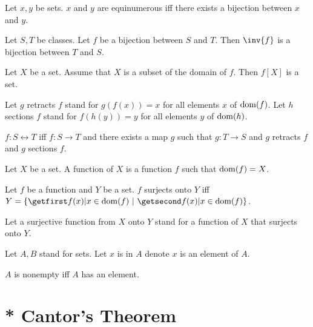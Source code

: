 \documentclass{article}
\begin{document}
\begin{forthel}
    \begin{definition*}
      Let $x, y$ be sets.
      $x$ and $y$ are equinumerous iff there exists a bijection between $x$ and
      $y$.
    \end{definition*}


\begin{lemma} Let $S, T$ be classes.
Let $f$ be a bijection between $S$ and $T$.
Then $\inv{f}$ is a bijection between $T$ and $S$.
\end{lemma}

  \begin{axiom}
    Let $X$ be a set.
    Assume that $X$ is a subset of the domain of $f$.
    Then $f[X]$ is a set.
  \end{axiom}

  Let $g$ retracts $f$ stand for $g(f(x)) = x$ for all elements $x$ of
  $\operatorname{dom}(f)$.
  Let $h$ sections $f$ stand for $f(h(y)) = y$ for all elements $y$ of
  $\operatorname{dom}(h)$.

  \begin{definition}
    $f : S \leftrightarrow T$ iff $f : S \rightarrow T$ and there exists a map
    $g$ such that $g : T \rightarrow S$ and $g$ retracts $f$ and $g$ sections
    $f$.
  \end{definition}

\begin{definition*}
      Let $X$ be a set.
      A function of $X$ is a function $f$ such that $\operatorname{dom}(f) = X$.
    \end{definition*}

    \begin{definition*}
      Let $f$ be a function and $Y$ be a set.
      $f$ surjects onto $Y$ iff $Y = \class{f(x) | x \in \dom(f)}$.
    \end{definition*}

    Let a surjective function from $X$ onto $Y$ stand for a function of $X$ that
    surjects onto $Y$.


Let $A,B$ stand for sets.
Let $x$ is in $A$ denote $x$ is an element of $A$.

\begin{definition}[1 3]
$A$ is nonempty iff $A$ has an element.
\end{definition}

\end{forthel}

\section{* Cantor's Theorem}
\end{document}
